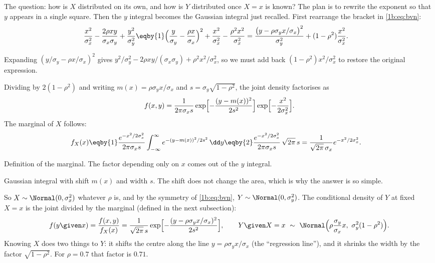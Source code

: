 \label{1b:ex:bvn-marginal}
The question: how is $X$ distributed on its own, and how is $Y$ distributed
once $X=x$ is known? The plan is to rewrite the exponent so that $y$ appears
in a single square. Then the $y$ integral becomes the Gaussian integral just
recalled. First rearrange the bracket in \eqref{1b:eq:bvn}:
\begin{align*}
  \frac{x^2}{\sigma_x^2}-\frac{2\rho xy}{\sigma_x\sigma_y}+\frac{y^2}{\sigma_y^2}
  &\eqby{1} \Bigl(\frac{y}{\sigma_y}-\frac{\rho x}{\sigma_x}\Bigr)^2
            +\frac{x^2}{\sigma_x^2}-\frac{\rho^2x^2}{\sigma_x^2}
   = \frac{\bigl(y-\rho\sigma_yx/\sigma_x\bigr)^2}{\sigma_y^2}
            +(1-\rho^2)\frac{x^2}{\sigma_x^2}.
\end{align*}
\begin{explain}
  \item Expanding $(y/\sigma_y-\rho x/\sigma_x)^2$ gives
        $y^2/\sigma_y^2-2\rho xy/(\sigma_x\sigma_y)+\rho^2x^2/\sigma_x^2$,
        so we must add back $(1-\rho^2)x^2/\sigma_x^2$ to restore the
        original expression.
\end{explain}
Dividing by $2(1-\rho^2)$ and writing $m(x)=\rho\sigma_yx/\sigma_x$ and
$s=\sigma_y\sqrt{1-\rho^2}$, the joint density factorises as
\[
  f(x,y)=\frac{1}{2\pi\sigma_x s}
  \exp\Bigl[-\frac{(y-m(x))^2}{2s^2}\Bigr]\exp\Bigl[-\frac{x^2}{2\sigma_x^2}\Bigr].
\]
The marginal of $X$ follows:
\begin{align*}
  f_X(x)
  &\eqby{1} \frac{e^{-x^2/2\sigma_x^2}}{2\pi\sigma_xs}
     \int_{-\infty}^{\infty}e^{-(y-m(x))^2/2s^2}\,\dd y
   \eqby{2} \frac{e^{-x^2/2\sigma_x^2}}{2\pi\sigma_xs}\,\sqrt{2\pi}\,s
   = \frac{1}{\sqrt{2\pi}\,\sigma_x}e^{-x^2/2\sigma_x^2}.
\end{align*}
\begin{explain}
  \item Definition of the marginal. The factor depending only on $x$ comes
        out of the $y$ integral.
  \item Gaussian integral with shift $m(x)$ and width $s$. The shift does not
        change the area, which is why the answer is so simple.
\end{explain}
So $X\sim\Normal(0,\sigma_x^2)$ whatever $\rho$ is, and by the symmetry of
\eqref{1b:eq:bvn}, $Y\sim\Normal(0,\sigma_y^2)$. The conditional density of
$Y$ at fixed $X=x$ is the joint divided by the marginal (defined in the next
subsection):
\[
  f(y\given x)=\frac{f(x,y)}{f_X(x)}
  =\frac{1}{\sqrt{2\pi}\,s}\exp\Bigl[-\frac{(y-\rho\sigma_yx/\sigma_x)^2}{2s^2}\Bigr],
  \qquad
  Y\given X=x\ \sim\ \Normal\Bigl(\rho\frac{\sigma_y}{\sigma_x}x,\
  \sigma_y^2(1-\rho^2)\Bigr).
\]
Knowing $X$ does two things to $Y$: it shifts the centre along the line
$y=\rho\sigma_yx/\sigma_x$ (the ``regression line''), and it shrinks the
width by the factor $\sqrt{1-\rho^2}$. For $\rho=0.7$ that factor is $0.71$.

